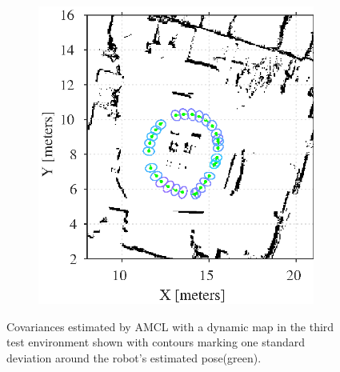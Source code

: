 \begin{figure}[htbp]
	\centering
	\begin{subfigure}[t]{0.55\textwidth}
		\includegraphics[scale=1.0]{chapters/evaluation/figures/localization_dynamic_map3}		
	\end{subfigure}
	\begin{subfigure}[t]{0.2\textwidth}
	\end{subfigure}
	
	\caption{Covariances estimated by AMCL with a dynamic map in the third test environment shown with contours marking one standard deviation around the robot's estimated pose(green).}
    \label{fig:amcl_covariance_dynamic3}
\end{figure}